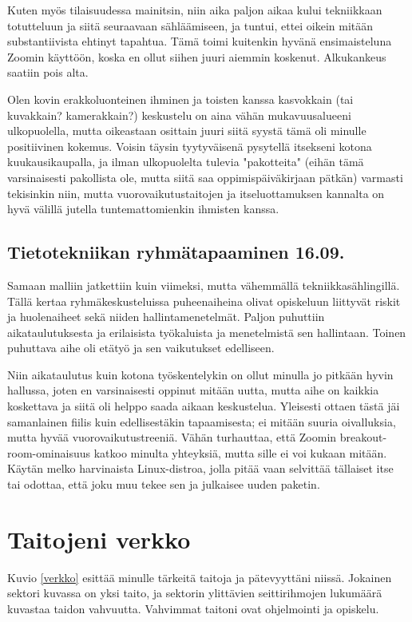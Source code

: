 \documentclass[utf8]{gradu3}
\begin{document}
Kuten myös tilaisuudessa mainitsin, niin aika paljon aikaa kului tekniikkaan
totutteluun ja siitä seuraavaan sähläämiseen, ja tuntui, ettei oikein mitään
substantiivista ehtinyt tapahtua. Tämä toimi kuitenkin hyvänä ensimaisteluna
Zoomin käyttöön, koska en ollut siihen juuri aiemmin koskenut. Alkukankeus
saatiin pois alta.

Olen kovin erakkoluonteinen ihminen ja toisten kanssa kasvokkain (tai
kuvakkain? kamerakkain?) keskustelu on aina vähän mukavuusalueeni
ulkopuolella, mutta oikeastaan osittain juuri siitä syystä tämä oli minulle
positiivinen kokemus. Voisin täysin tyytyväisenä pysytellä itsekseni kotona
kuukausikaupalla, ja ilman ulkopuolelta tulevia "pakotteita" (eihän tämä
varsinaisesti pakollista ole, mutta siitä saa oppimispäiväkirjaan pätkän)
varmasti tekisinkin niin, mutta vuorovaikutustaitojen ja itseluottamuksen
kannalta on hyvä välillä jutella tuntemattomienkin ihmisten kanssa.

\section{Tietotekniikan ryhmätapaaminen 16.09.}

Samaan malliin jatkettiin kuin viimeksi, mutta vähemmällä
tekniikkasählingillä. Tällä kertaa ryhmäkeskusteluissa puheenaiheina olivat
opiskeluun liittyvät riskit ja huolenaiheet sekä niiden hallintamenetelmät.
Paljon puhuttiin aikataulutuksesta ja erilaisista työkaluista ja menetelmistä
sen hallintaan. Toinen puhuttava aihe oli etätyö ja sen vaikutukset
edelliseen.

Niin aikataulutus kuin kotona työskentelykin on ollut minulla jo pitkään
hyvin hallussa, joten en varsinaisesti oppinut mitään uutta, mutta aihe on
kaikkia koskettava ja siitä oli helppo saada aikaan keskustelua. Yleisesti
ottaen tästä jäi samanlainen fiilis kuin edellisestäkin tapaamisesta; ei
mitään suuria oivalluksia, mutta hyvää vuorovaikutustreeniä. Vähän
turhauttaa, että Zoomin breakout-room-ominaisuus katkoo minulta yhteyksiä,
mutta sille ei voi kukaan mitään. Käytän melko harvinaista Linux-distroa,
jolla pitää vaan selvittää tällaiset itse tai odottaa, että joku muu tekee
sen ja julkaisee uuden paketin.


\chapter{Taitojeni verkko} \label{kuvanPohdintaa}

Kuvio \ref{verkko} esittää minulle tärkeitä taitoja ja pätevyyttäni niissä.
Jokainen sektori kuvassa on yksi taito, ja sektorin ylittävien seittirihmojen
lukumäärä kuvastaa taidon vahvuutta. Vahvimmat taitoni ovat ohjelmointi ja
opiskelu.
\end{document}
